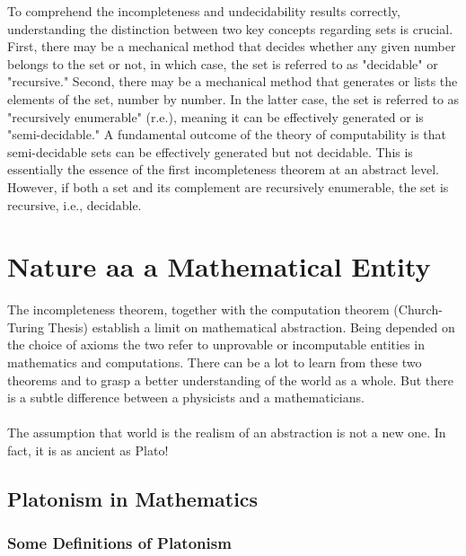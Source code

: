 \documentclass[10pt,a4paper]{article}
\newcounter{theo}
\begin{document}
                            To comprehend the incompleteness and undecidability results correctly, understanding the distinction between two key concepts regarding sets is crucial. First, there may be a mechanical method that decides whether any given number belongs to the set or not, in which case, the set is referred to as "decidable" or "recursive." Second, there may be a mechanical method that generates or lists the elements of the set, number by number. In the latter case, the set is referred to as "recursively enumerable" (r.e.), meaning it can be effectively generated or is "semi-decidable." A fundamental outcome of the theory of computability is that semi-decidable sets can be effectively generated but not decidable. This is essentially the essence of the first incompleteness theorem at an abstract level. However, if both a set and its complement are recursively enumerable, the set is recursive, i.e., decidable.
            \section{Nature aa a Mathematical Entity}
                The incompleteness theorem, together with the computation theorem (Church-Turing Thesis) establish a limit on mathematical abstraction. Being depended on the choice of axioms the two refer to unprovable or incomputable entities in mathematics and computations. There can be a lot to learn from these two theorems and to grasp a better understanding of the world as a whole. But there is a subtle difference between a physicists and a mathematicians. 
                \\
                \\
                The assumption that world is the realism of an abstraction is not a new one. In fact, it is as ancient as Plato! 
                \subsection{Platonism in Mathematics}
                    \subsubsection{Some Definitions of Platonism}
\end{document}
